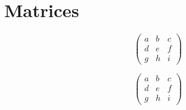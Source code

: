 \documentclass[11pt]{article}  %
\begin{document}
\section*{Matrices}

\[
\left(
\begin{array}{ccc}
a & b & c \\
d & e & f \\
g & h & i
\end{array}
\right)
\]

\[
\begin{pmatrix}
a & b & c \\
d & e & f \\
g & h & i
\end{pmatrix} \]
\end{document}
